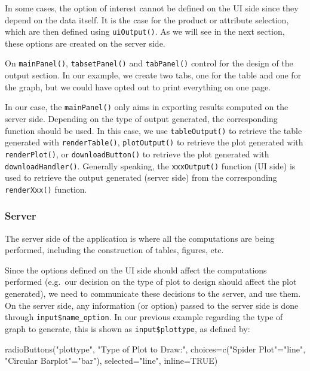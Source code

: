 \documentclass[
]{book}
\newenvironment{Shaded}{\begin{snugshade}}{\end{snugshade}}
\newcommand{\AttributeTok}[1]{\textcolor[rgb]{0.77,0.63,0.00}{#1}}
\newcommand{\ConstantTok}[1]{\textcolor[rgb]{0.00,0.00,0.00}{#1}}
\newcommand{\FunctionTok}[1]{\textcolor[rgb]{0.00,0.00,0.00}{#1}}
\newcommand{\NormalTok}[1]{#1}
\newcommand{\OtherTok}[1]{\textcolor[rgb]{0.56,0.35,0.01}{#1}}
\newcommand{\StringTok}[1]{\textcolor[rgb]{0.31,0.60,0.02}{#1}}
\begin{document}
In some cases, the option of interest cannot be defined on the UI side since they depend on the data itself. It is the case for the product or attribute selection, which are then defined using \texttt{uiOutput()}. As we will see in the next section, these options are created on the server side.

On \texttt{mainPanel()}, \texttt{tabsetPanel()} and \texttt{tabPanel()} control for the design of the output section. In our example, we create two tabs, one for the table and one for the graph, but we could have opted out to print everything on one page.

In our case, the \texttt{mainPanel()} only aims in exporting results computed on the server side. Depending on the type of output generated, the corresponding function should be used. In this case, we use \texttt{tableOutput()} to retrieve the table generated with \texttt{renderTable()}, \texttt{plotOutput()} to retrieve the plot generated with \texttt{renderPlot()}, or \texttt{downloadButton()} to retrieve the plot generated with \texttt{downloadHandler()}. Generally speaking, the \texttt{xxxOutput()} function (UI side) is used to retrieve the output generated (server side) from the corresponding \texttt{renderXxx()} function.

\hypertarget{server}{%
\subsubsection{Server}\label{server}}

The server side of the application is where all the computations are being performed, including the construction of tables, figures, etc.

Since the options defined on the UI side should affect the computations performed (e.g.~our decision on the type of plot to design should affect the plot generated), we need to communicate these decisions to the server, and use them.
On the server side, any information (or option) passed to the server side is done through \texttt{input\$name\_option}. In our previous example regarding the type of graph to generate, this is shown as \texttt{input\$plottype}, as defined by:

\begin{Shaded}
\begin{Highlighting}[]
\FunctionTok{radioButtons}\NormalTok{(}\StringTok{"plottype"}\NormalTok{, }\StringTok{"Type of Plot to Draw:"}\NormalTok{, }
             \AttributeTok{choices=}\FunctionTok{c}\NormalTok{(}\StringTok{"Spider Plot"}\OtherTok{=}\StringTok{"line"}\NormalTok{, }\StringTok{"Circular Barplot"}\OtherTok{=}\StringTok{"bar"}\NormalTok{), }
             \AttributeTok{selected=}\StringTok{"line"}\NormalTok{, }\AttributeTok{inline=}\ConstantTok{TRUE}\NormalTok{)}
\end{Highlighting}
\end{Shaded}
\end{document}
